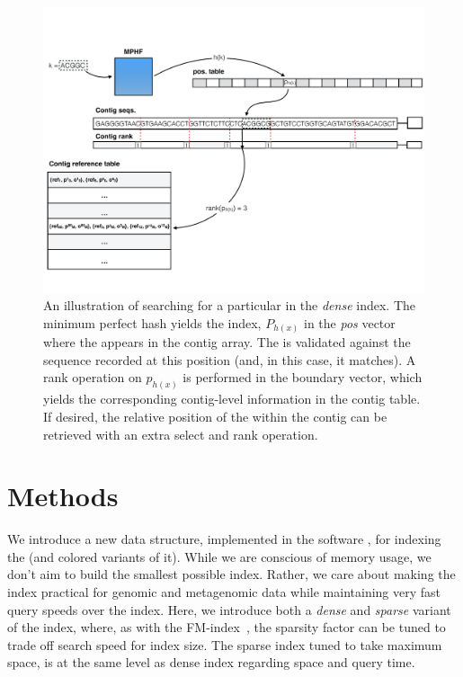 \begin{figure}
  \includegraphics[width=\textwidth]{figs/index_fig}
\caption{An illustration of searching for a particular \kmer in the \emph{dense}
  \pufferfish index. The minimum perfect hash yields the index, $P_{h(x)}$ in the
  \emph{pos} vector where the \kmer appears in the contig array. The \kmer is
  validated against the sequence recorded at this position (and, in this case,
  it matches). A rank operation on $p_{h(x)}$ is performed in the boundary
  vector, which yields the corresponding contig-level information in the contig
  table. If desired, the relative position of the \kmer within the contig can be
  retrieved with an extra select and rank operation.}
\label{fig:dense_index}
\end{figure}


\section{Methods}\label{sec:methods}

We introduce a new data structure, implemented in the software \pufferfish, for
indexing the \ccdbg (and colored variants of it). While we are conscious of
memory usage, we don't aim to build the smallest possible index. Rather, we care
about making the \ccdbg index practical for genomic and metagenomic data while
maintaining very fast query speeds over the index. Here, we introduce both a
\emph{dense} and \emph{sparse} variant of the \pufferfish index, where, as with the
FM-index~\cite{Ferragina2001Experimental}, the sparsity factor can be tuned to
trade off search speed for index size. The sparse index tuned to take maximum space,
is at the same level as dense index regarding space and \kmer query time.

